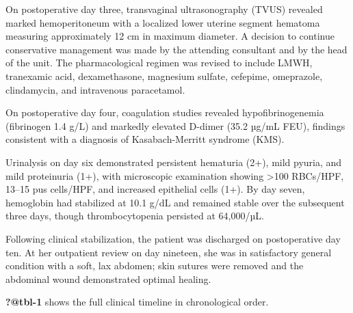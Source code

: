 \documentclass[
  letterpaper,
  DIV=11,
  numbers=noendperiod]{scrartcl}
\begin{document}
On postoperative day three, transvaginal ultrasonography (TVUS) revealed
marked hemoperitoneum with a localized lower uterine segment hematoma
measuring approximately 12 cm in maximum diameter. A decision to
continue conservative management was made by the attending consultant
and by the head of the unit. The pharmacological regimen was revised to
include LMWH, tranexamic acid, dexamethasone, magnesium sulfate,
cefepime, omeprazole, clindamycin, and intravenous paracetamol.

On postoperative day four, coagulation studies revealed
hypofibrinogenemia (fibrinogen 1.4 g/L) and markedly elevated D-dimer
(35.2 µg/mL FEU), findings consistent with a diagnosis of
Kasabach-Merritt syndrome (KMS).

Urinalysis on day six demonstrated persistent hematuria (2+), mild
pyuria, and mild proteinuria (1+), with microscopic examination showing
\textgreater100 RBCs/HPF, 13--15 pus cells/HPF, and increased epithelial
cells (1+). By day seven, hemoglobin had stabilized at 10.1 g/dL and
remained stable over the subsequent three days, though thrombocytopenia
persisted at 64,000/µL.

Following clinical stabilization, the patient was discharged on
postoperative day ten. At her outpatient review on day nineteen, she was
in satisfactory general condition with a soft, lax abdomen; skin sutures
were removed and the abdominal wound demonstrated optimal healing.

\textbf{?@tbl-1} shows the full clinical timeline in chronological
order.
\end{document}
